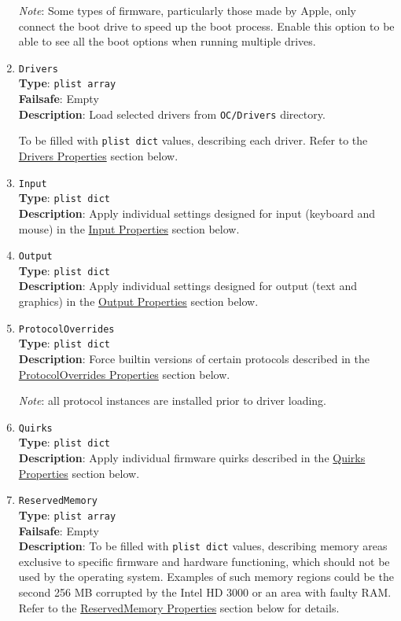 \documentclass[]{article}
\begin{document}
\begin{enumerate}
  \emph{Note}: Some types of firmware, particularly those made by Apple, only connect the boot
  drive to speed up the boot process. Enable this option to be able to see all the
  boot options when running multiple drives.

\item
  \texttt{Drivers}\\
  \textbf{Type}: \texttt{plist\ array}\\
  \textbf{Failsafe}: Empty\\
  \textbf{Description}: Load selected drivers from \texttt{OC/Drivers} directory.

  To be filled with \texttt{plist\ dict} values, describing each driver.
  Refer to the \hyperref[uefidriversprops]{Drivers Properties} section below.

\item
  \texttt{Input}\\
  \textbf{Type}: \texttt{plist\ dict}\\
  \textbf{Description}: Apply individual settings designed for input (keyboard and mouse) in the
  \hyperref[uefiinputprops]{Input Properties} section below.

\item
  \texttt{Output}\\
  \textbf{Type}: \texttt{plist\ dict}\\
  \textbf{Description}: Apply individual settings designed for output (text and graphics) in the
  \hyperref[uefioutputprops]{Output Properties} section below.

\item
  \texttt{ProtocolOverrides}\\
  \textbf{Type}: \texttt{plist\ dict}\\
  \textbf{Description}: Force builtin versions of certain protocols described
  in the \hyperref[uefiprotoprops]{ProtocolOverrides Properties} section below.

  \emph{Note}: all protocol instances are installed prior to driver loading.

\item
  \texttt{Quirks}\\
  \textbf{Type}: \texttt{plist\ dict}\\
  \textbf{Description}: Apply individual firmware quirks described in the
  \hyperref[uefiquirkprops]{Quirks Properties} section below.

\item
  \texttt{ReservedMemory}\\
  \textbf{Type}: \texttt{plist\ array}\\
  \textbf{Failsafe}: Empty\\
  \textbf{Description}: To be filled with \texttt{plist\ dict} values,
  describing memory areas exclusive to specific firmware and hardware functioning,
  which should not be used by the operating system. Examples of such memory regions
  could be the second 256 MB corrupted by the Intel HD 3000 or an area with faulty RAM.
  Refer to the \hyperref[uefirsvdprops]{ReservedMemory Properties} section below for details.

\end{enumerate}
\end{document}
